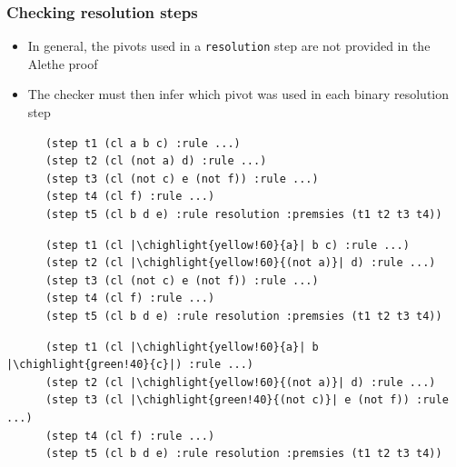 \documentclass[usepdftitle=false,aspectratio=169]{beamer}
\newcommand\vitem{\vfill\item}
\newcommand\chighlight[2]{\setlength{\fboxsep}{0pt}\colorbox{#1}{#2\strut}}
\begin{document}
\begin{frame}[fragile]
  \frametitle{Checking resolution steps}
  \begin{itemize}
    \item In general, the pivots used in a \texttt{resolution} step are
      not provided in the Alethe proof
    \vitem The checker must then infer which pivot was used in each binary
    resolution step
  \end{itemize}
  \begin{overprint}
    \begin{verbatim}
      (step t1 (cl a b c) :rule ...)
      (step t2 (cl (not a) d) :rule ...)
      (step t3 (cl (not c) e (not f)) :rule ...)
      (step t4 (cl f) :rule ...)
      (step t5 (cl b d e) :rule resolution :premsies (t1 t2 t3 t4))
    \end{verbatim}
    \begin{prooftree}
    \end{prooftree}
    \begin{verbatim}
      (step t1 (cl |\chighlight{yellow!60}{a}| b c) :rule ...)
      (step t2 (cl |\chighlight{yellow!60}{(not a)}| d) :rule ...)
      (step t3 (cl (not c) e (not f)) :rule ...)
      (step t4 (cl f) :rule ...)
      (step t5 (cl b d e) :rule resolution :premsies (t1 t2 t3 t4))
    \end{verbatim}
    \begin{prooftree}
    \end{prooftree}
    \begin{verbatim}
      (step t1 (cl |\chighlight{yellow!60}{a}| b |\chighlight{green!40}{c}|) :rule ...)
      (step t2 (cl |\chighlight{yellow!60}{(not a)}| d) :rule ...)
      (step t3 (cl |\chighlight{green!40}{(not c)}| e (not f)) :rule ...)
      (step t4 (cl f) :rule ...)
      (step t5 (cl b d e) :rule resolution :premsies (t1 t2 t3 t4))
    \end{verbatim}

\end{overprint}
\end{frame}
\end{document}
